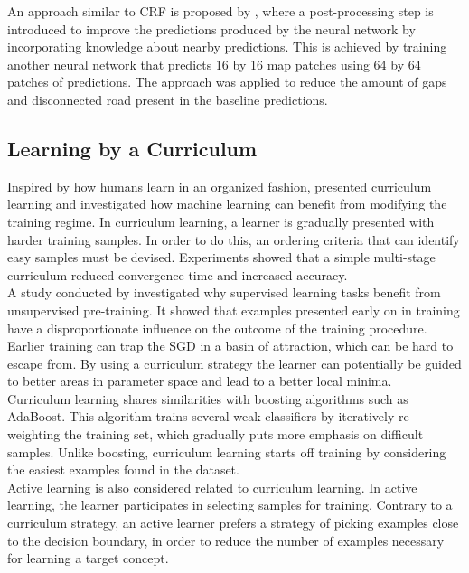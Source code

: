 An approach similar to \ac{CRF} is proposed by \cite{Mnih_roads_high_res_aerial_images}, where a post-processing step is introduced to improve the predictions produced by the neural network by incorporating knowledge about nearby predictions. This is achieved by training another neural network that predicts 16 by 16 map patches using 64 by 64 patches of predictions. The approach was applied to reduce the amount of gaps and disconnected road present in the baseline predictions. 


 
\subsection{Learning by a Curriculum}
Inspired by how humans learn in an organized fashion, \cite{Bengio_curriculumlearning} presented curriculum learning and investigated how machine learning can benefit from modifying the training regime. In curriculum learning, a learner is gradually presented with harder training samples. In order to do this, an ordering criteria that can identify easy samples must be devised. Experiments showed that a simple multi-stage curriculum reduced convergence time and increased accuracy. \\

A study conducted by \cite{Erhan-unsupervised-pre-training} investigated why supervised learning tasks benefit from unsupervised pre-training. It showed that examples presented early on in training have a disproportionate influence on the outcome of the training procedure. Earlier training can trap the \ac{SGD} in a basin of attraction, which can be hard to escape from.  By using a curriculum strategy the learner can potentially be guided to better areas in parameter space and lead to a better local minima. \\

Curriculum learning shares similarities with boosting algorithms such as AdaBoost. This algorithm trains several weak classifiers by iteratively re-weighting the training set, which gradually puts more emphasis on difficult samples. Unlike boosting, curriculum learning starts off training by considering the easiest examples found in the dataset.\\

Active learning \citep{Cohn_active_learning} is also considered related to curriculum learning. In active learning, the learner participates in selecting samples for training. Contrary to a curriculum strategy, an active learner prefers a strategy of picking examples close to the decision boundary, in order to reduce the number of examples necessary for learning a target concept.\\

